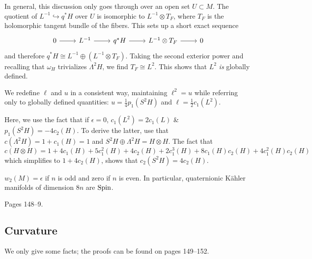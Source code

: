 \documentclass{scrartcl}
\begin{document}
\medskip

In general, this discussion only goes through over an open set $U\subset M$. The quotient of $L^{-1}\hookrightarrow q^*H$ over $U$ is isomorphic to $L^{-1}\otimes T_F$, where $T_F$ is the holomorphic tangent bundle of the fibers. This sets up a short exact sequence
\begin{equation*}
	\begin{tikzcd}
		0 \ar[r] & L^{-1} \ar[r] & q^*H \ar[r] & L^{-1}\otimes T_F \ar[r] & 0
	\end{tikzcd}
\end{equation*}
and therefore $q^*H\cong L^{-1} \oplus (L^{-1}\otimes T_F)$. Taking the second exterior power and recalling that $\omega_H$ trivializes $\Lambda^2H$, we find $T_F\cong L^2$. This shows that $L^2$ \emph{is} globally defined.

\begin{mydef}
	 We redefine $\ell$ and $u$ in a consistent way, maintaining $\ell^2=u$ while referring only to globally defined quantities: $u=\frac{1}{4}p_1(S^2H)$ and $\ell=\frac{1}{2}c_1(L^2)$.
\end{mydef}

\begin{rem}
	Here, we use the fact that if $\epsilon=0$, $c_1(L^2)=2c_1(L)$ \& $p_1(S^2H)=-4c_2(H)$. To derive the latter, use that $c(\Lambda^2 H)=1+c_1(H)=1$ and $S^2H\oplus \Lambda^2H=H\otimes H$. The fact that 
	\begin{equation*}
		c(H\otimes H)=1+4c_1(H)+5c_1^2(H)+4c_2(H)+2c_1^3(H)+8c_1(H)c_2(H)+4c_1^2(H)c_2(H)
	\end{equation*} 
	which simplifies to $1+4c_2(H)$, shows that $c_2(S^2H)=4c_2(H)$.
\end{rem}

\begin{prop}
	$w_2(M)=\epsilon$ if $n$ is odd and zero if $n$ is even. In particular, quaternionic K\"ahler manifolds of dimension $8n$ are $\operatorname{Spin}$.
\end{prop}
\begin{myproof}
	Pages 148--9.
\end{myproof}

\subsection{Curvature}

We only give some facts; the proofs can be found on pages 149--152.
\end{document}
